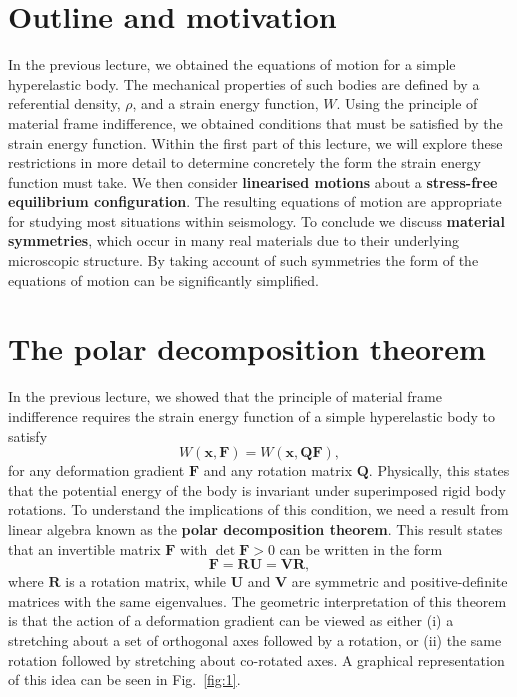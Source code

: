 \section*{Outline and motivation}

In the previous lecture, we obtained the equations of motion for a simple hyperelastic body. The mechanical properties
of such bodies are defined by a referential density, $\rho$, and a strain energy function, $W$. Using the principle of material 
frame indifference, we obtained conditions that must be satisfied by the strain energy function. Within the first part of this lecture, 
we will explore these restrictions in more detail to determine concretely the form the strain energy function must take. We then consider 
\textbf{linearised motions} about a \textbf{stress-free equilibrium configuration}. The resulting equations of motion are appropriate for studying most 
situations within seismology. To conclude we discuss \textbf{material symmetries}, which occur in many real materials due to their underlying 
microscopic structure. By taking account of such symmetries the form of the equations of motion can be significantly simplified.

\section*{The polar decomposition theorem}

In the previous lecture, we showed that the principle of material frame indifference requires the strain energy function of a simple hyperelastic body to satisfy
\begin{equation}
W(\mathbf{x}, \mathbf{F}) = W(\mathbf{x}, \mathbf{Q}\mathbf{F}),
\label{eq:1}
\end{equation}
for any deformation gradient $\mathbf{F}$ and any rotation matrix $\mathbf{Q}$. Physically, this states that the potential
energy of the body is invariant under superimposed rigid body rotations. To understand the implications of this condition,
we need a result from linear algebra known as the \textbf{polar decomposition theorem}. This result states that an invertible matrix 
$\mathbf{F}$ with $\det \mathbf{F} > 0$ can be written in the form
\begin{equation}
\mathbf{F} = \mathbf{R}\mathbf{U} = \mathbf{V}\mathbf{R},
\label{eq:2}
\end{equation}
where $\mathbf{R}$ is a rotation matrix, while $\mathbf{U}$ and $\mathbf{V}$ are symmetric and positive-definite 
matrices with the same eigenvalues. The geometric interpretation of this theorem is that the action of a deformation 
gradient can be viewed as either (i) a stretching about a set of orthogonal axes followed by a rotation, or (ii) the same 
rotation followed by stretching about co-rotated axes. A graphical representation of this idea
can be seen in Fig.~\ref{fig:1}.

